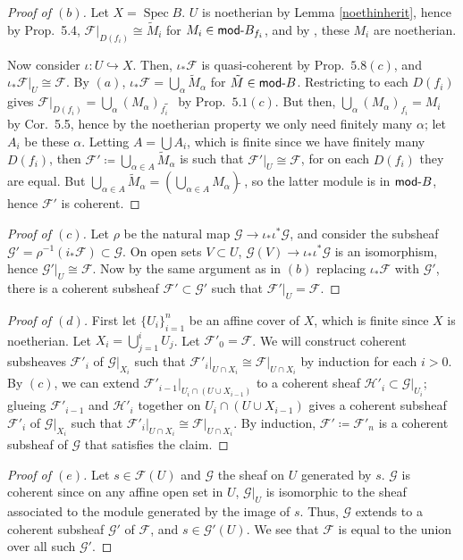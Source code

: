 \documentclass[12pt,letterpaper]{article}
\theoremstyle{definition}
\theoremstyle{remark}
\numberwithin{equation}{section}
\numberwithin{figure}{problem}
\DeclareMathOperator{\Spec}{Spec}
\newcommand{\FF}{\mathscr{F}}
\newcommand{\GG}{\mathscr{G}}
\newcommand{\HH}{\mathscr{H}}
\newcommand{\Mod}{\mathsf{mod}\mathchar`-}
\begin{document}
\begin{proof}[Proof of $(b)$]
  Let $X = \Spec B$. $U$ is noetherian by Lemma \ref{noethinherit}, hence by Prop.~5.4, $\FF\vert_{D(f_i)} \cong \tilde{M}_i$ for $M_i \in \Mod B_{f_i}$, and by \cite[Prop.~6.5]{AM69}, these $M_i$ are noetherian.
  \par Now consider $\iota\colon U \hookrightarrow X$. Then, $\iota_*\FF$ is quasi-coherent by Prop.~$5.8(c)$, and $\iota_*\FF\vert_U \cong \FF$. By $(a)$, $\iota_*\FF = \bigcup_\alpha \tilde{M}_\alpha$ for $\tilde{M} \in \Mod B$. Restricting to each $D(f_i)$ gives $\FF\vert_{D(f_i)} = \bigcup_\alpha (M_\alpha)_{f_i}\!\!\tilde{}\:\:$ by Prop.~$5.1(c)$. But then, $\bigcup_\alpha (M_\alpha)_{f_i} = M_i$ by Cor.~5.5, hence by the noetherian property we only need finitely many $\alpha$; let $A_i$ be these $\alpha$. Letting $A = \bigcup A_i$, which is finite since we have finitely many $D(f_i)$, then $\FF' \coloneqq \bigcup_{\alpha \in A} \tilde{M}_\alpha$ is such that $\FF'\vert_U \cong \FF$, for on each $D(f_i)$ they are equal. But $\bigcup_{\alpha \in A} \tilde{M}_\alpha = \left(\bigcup_{\alpha \in A} M_\alpha\right)\tilde{}\:$, so the latter module is in $\Mod B$, hence $\FF'$ is coherent.
\end{proof}
\begin{proof}[Proof of $(c)$]
  Let $\rho$ be the natural map $\GG \to \iota_*\iota^*\GG$, and consider the subsheaf $\GG' = \rho^{-1}(i_*\FF) \subset \GG$. On open sets $V \subset U$, $\GG(V) \to \iota_*\iota^*\GG$ is an isomorphism, hence $\GG'\vert_U \cong \FF$. Now by the same argument as in $(b)$ replacing $\iota_*\FF$ with $\GG'$, there is a coherent subsheaf $\FF' \subset \GG'$ such that $\FF'\vert_U = \FF$.
\end{proof}
\begin{proof}[Proof of $(d)$]
  First let $\{U_i\}_{i=1}^n$ be an affine cover of $X$, which is finite since $X$ is noetherian. Let $X_i = \bigcup_{j=1}^i U_j$. Let $\FF'_0 = \FF$. We will construct coherent subsheaves $\FF'_i$ of $\GG\vert_{X_i}$ such that $\FF'_i\vert_{U \cap X_i} \cong \FF\vert_{U \cap X_i}$ by induction for each $i > 0$. By $(c)$, we can extend $\FF'_{i-1}\vert_{U_i \cap (U \cup X_{i-1})}$ to a coherent sheaf $\HH'_i \subset \GG\vert_{U_i}$; glueing $\FF'_{i-1}$ and $\HH'_i$ together on $U_i \cap (U \cup X_{i-1})$ gives a coherent subsheaf $\FF'_i$ of $\GG\vert_{X_i}$ such that $\FF'_i\vert_{U \cap X_i} \cong \FF\vert_{U \cap X_i}$. By induction, $\FF' \coloneqq \FF'_n$ is a coherent subsheaf of $\GG$ that satisfies the claim.
\end{proof}
\begin{proof}[Proof of $(e)$]
  Let $s \in \FF(U)$ and $\GG$ the sheaf on $U$ generated by $s$. $\GG$ is coherent since on any affine open set in $U$, $\GG\vert_U$ is isomorphic to the sheaf associated to the module generated by the image of $s$. Thus, $\GG$ extends to a coherent subsheaf $\GG'$ of $\FF$, and $s \in \GG'(U)$. We see that $\FF$ is equal to the union over all such $\GG'$.
\end{proof}
\end{document}
